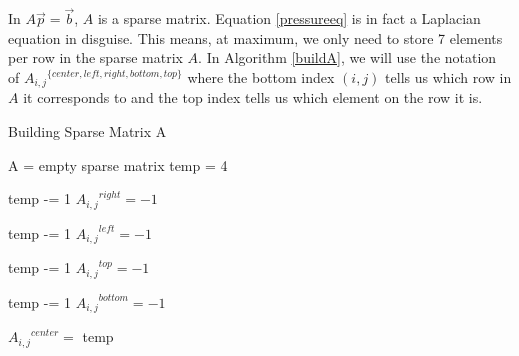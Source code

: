 In $A\vec{p} = \vec{b}$, $A$ is a sparse matrix. Equation \ref{pressureeq} is in fact a Laplacian equation in disguise. This means, at maximum, we only need to store 7 elements per row in the sparse matrix $A$. In Algorithm \ref{buildA}, we will use the notation of ${A_{i,j}}^{\{center, left, right, bottom, top\}}$ where the bottom index $(i,j)$ tells us which row in $A$ it corresponds to and the top index tells us which element on the row it is.

\begin{algorithm}
\caption{Building Sparse Matrix A}
\begin{algorithmic}
\STATE A = empty sparse matrix
\STATE temp = 4

\STATE temp -= 1
\STATE ${A_{i,j}}^{right} = -1$
\ENDIF

\STATE temp -= 1
\STATE ${A_{i,j}}^{left} = -1$
\ENDIF

\STATE temp -= 1
\STATE ${A_{i,j}}^{top} = -1$
\ENDIF

\STATE temp -= 1
\STATE ${A_{i,j}}^{bottom} = -1$
\ENDIF

\STATE ${A_{i,j}}^{center} = $ temp

\ENDIF
\ENDFOR
\ENDFOR
\end{algorithmic}
\label{buildA}
\end{algorithm}
